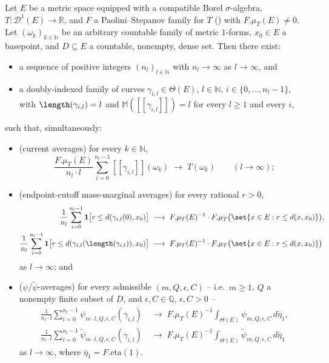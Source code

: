 \begin{lemma}\label{BBSamplingDiagonal}
  Let $E$ be a metric space equipped with a compatible Borel $\sigma$-algebra,
  $T \colon \mathcal{D}^1(E) \to \mathbb{R}$, and $F$ a Paolini--Stepanov family for $T$
  () with $F.\mu_T(E) \ne 0$. Let $(\omega_k)_{k \in \mathbb{N}}$ be an arbitrary
  countable family of metric $1$-forms, $x_0 \in E$ a basepoint, and $D \subseteq E$ a countable,
  nonempty, dense set. Then there exist:
  \begin{itemize}
    \item a sequence of positive integers $(n_l)_{l \in \mathbb{N}}$ with $n_l \to \infty$ as
      $l \to \infty$, and
    \item a doubly-indexed family of curves $\gamma_{i,l} \in \Theta(E)$, $l \in \mathbb{N}$,
      $i \in \{0,\dots,n_l-1\}$, with $\length(\gamma_{i,l}) = l$ and $\mathbb{M}([[\gamma_{i,l}]])
      = l$ for every $l \ge 1$ and every $i$,
  \end{itemize}
  such that, simultaneously:
  \begin{itemize}
    \item[(I)] (current averages) for every $k \in \mathbb{N}$,
      \[
        \frac{F.\mu_T(E)}{n_l\cdot l}\sum_{i=0}^{n_l-1}[[\gamma_{i,l}]](\omega_k)
        \;\longrightarrow\; T(\omega_k)
        \qquad(l\to\infty)
        ;
      \]
    \item[(II)] (endpoint-cutoff mass-marginal averages) for every rational $r > 0$,
      \begin{align*}
        \frac{1}{n_l}\sum_{i=0}^{n_l-1} \mathbf{1}\bigl[r \le d(\gamma_{i,l}(0),x_0)\bigr]
        &\;\longrightarrow\; F.\mu_T(E)^{-1}\cdot F.\mu_T\bigl(\set{x\in E : r \le d(x,x_0)}\bigr)
        ,
        \\
        \frac{1}{n_l}\sum_{i=0}^{n_l-1} \mathbf{1}\bigl[r \le d(\gamma_{i,l}(\length(\gamma_{i,l})),x_0)\bigr]
        &\;\longrightarrow\; F.\mu_T(E)^{-1}\cdot F.\mu_T\bigl(\set{x\in E : r \le d(x,x_0)}\bigr)
      \end{align*}
      as $l\to\infty$; and
    \item[(III)] ($\psi$/$\tilde\psi$-averages) for every admissible $(m,Q,\epsilon,C)$ -- i.e.\
      $m \ge 1$, $Q$ a nonempty finite subset of $D$, and $\epsilon,C \in \mathbb{Q}$,
      $\epsilon,C>0$ --
      \begin{align*}
        \frac{1}{n_l\cdot l}\sum_{i=0}^{n_l-1}\psi_{m\cdot l,Q,\epsilon,C}(\gamma_{i,l})
        &\;\longrightarrow\; F.\mu_T(E)^{-1} \int_{\Theta(E)} \psi_{m,Q,\epsilon,C}\,d\overline\eta_1
        ,
        \\
        \frac{1}{n_l\cdot l}\sum_{i=0}^{n_l-1}\tilde\psi_{m\cdot l,Q,\epsilon,C}(\gamma_{i,l})
        &\;\longrightarrow\; F.\mu_T(E)^{-1} \int_{\Theta(E)} \tilde\psi_{m,Q,\epsilon,C}\,d\overline\eta_1
      \end{align*}
      as $l \to \infty$, where $\overline\eta_1 = F.\mathrm{eta}(1)$.
  \end{itemize}


\end{lemma}
